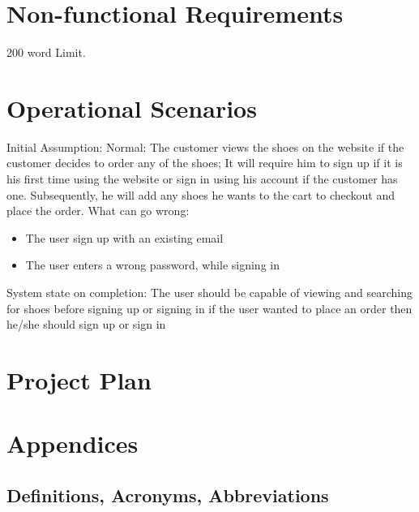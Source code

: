 \documentclass[12pt]{article}
\begin{document}
\section{Non-functional Requirements}
200 word Limit.





\section{Operational Scenarios}
Initial Assumption: 
Normal: The customer views the shoes on the website if the customer decides to order any of the shoes; It will require him to sign up if it is his first time using the website or sign in using his account if the customer has one. Subsequently, he will add any shoes he wants to the cart to checkout and place the order.
What can go wrong:

\begin{itemize}
\item The user sign up with an existing email
\item The user enters a wrong password, while signing in
\end{itemize}
System state on completion: The user should be capable of viewing and searching for shoes before signing up or signing in if the user wanted to place an order then he/she should sign up or sign in 
\section{Project Plan}


\section{Appendices}

\subsection{Definitions, Acronyms, Abbreviations}


\printbibliography
\end{document}
